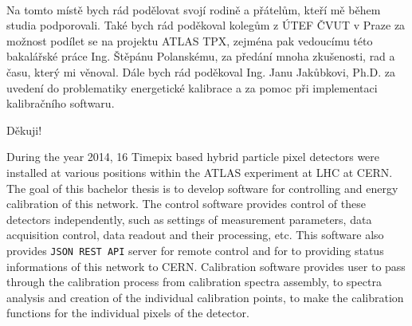 \documentclass[11pt,twoside,a4paper]{book}
\begin{document}
	\translate				%


	\coverpagestarts

	\newpage~
	
	\newpage

	\acknowledgements
	\noindent
	Na tomto místě bych rád podělovat svojí rodině a přátelům, kteří mě během studia podporovali. Také bych rád poděkoval kolegům z ÚTEF ČVUT v Praze za možnost podílet se na projektu ATLAS TPX, zejména pak vedoucímu této bakalářské práce Ing. Štěpánu Polanskému, za předání mnoha zkušenosti, rad a času, který mi věnoval. Dále bych rád poděkoval Ing. Janu Jakůbkovi, Ph.D. za uvedení do problematiky energetické kalibrace a za pomoc při implementaci kalibračního softwaru.

	\begin{flushright}
		Děkuji!
	\end{flushright}






 
	\abstractpage

	During the year 2014, 16 Timepix based hybrid particle pixel detectors were installed at various positions within the ATLAS experiment at LHC at CERN.
	The goal of this bachelor thesis is to develop software for controlling and energy calibration of this network. The control software provides control of these detectors independently, such as settings of measurement parameters, data acquisition control, data readout and their processing, etc. This software also provides \texttt{JSON REST API} server for remote control and for to providing status informations of this network to CERN.
	Calibration software provides user to pass through the calibration process from calibration spectra assembly, to spectra analysis and creation of the individual calibration points, to make the calibration functions for the individual pixels of the detector. 
\end{document}
